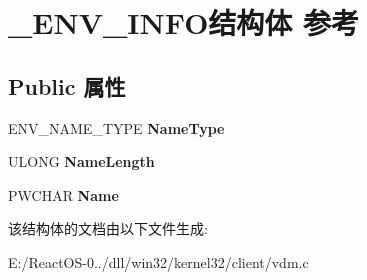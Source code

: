 \hypertarget{struct___e_n_v___i_n_f_o}{}\section{\+\_\+\+E\+N\+V\+\_\+\+I\+N\+F\+O结构体 参考}
\label{struct___e_n_v___i_n_f_o}
\subsection*{Public 属性}
\begin{DoxyCompactItemize}
\item 
\mbox{\label{struct___e_n_v___i_n_f_o_acd2a06886c551b0baebed5f926027b4a}} 
E\+N\+V\+\_\+\+N\+A\+M\+E\+\_\+\+T\+Y\+PE {\bfseries Name\+Type}
\item 
\mbox{\label{struct___e_n_v___i_n_f_o_a638472a257cec14e08bf7b20e3b71593}} 
U\+L\+O\+NG {\bfseries Name\+Length}
\item 
\mbox{\label{struct___e_n_v___i_n_f_o_af68ae48a45400d043ce198f2eb685fd2}} 
P\+W\+C\+H\+AR {\bfseries Name}
\end{DoxyCompactItemize}


该结构体的文档由以下文件生成\+:\begin{DoxyCompactItemize}
\item 
E\+:/\+React\+O\+S-\/0../dll/win32/kernel32/client/vdm.\+c\end{DoxyCompactItemize}
